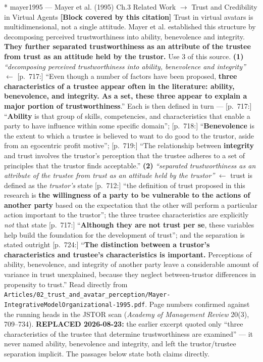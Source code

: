 \documentclass[11pt, a4paper]{article}
\makeatletter
\newcounter{citentry}
\newcommand{\citentry@core}[7]{%
  \stepcounter{citentry}
  \begingroup
  \sbox{\citentry@measurebox}{%
    \begin{minipage}{\linewidth}
      \noindent\colorbox{konstanzblue}{\parbox{\dimexpr\linewidth-2\fboxsep}{%
        \vspace{3pt}
        \textbf{\#\thecitentry \quad #2} \hfill \textit{#3}
        \vspace{3pt}
      }}
      \vspace{3pt}
      \noindent\begin{tabular}{@{}p{2.7cm} p{\dimexpr\linewidth-3cm}@{}}
        \textit{\small Sentence in thesis:} & #4 \\[5pt]
        \textbf{Usage:}\hfill       & #5 \\[5pt]
        \textit{\small Original source:}     & #6 \\[5pt]
        \textbf{How to check:}             & #7 \\
      \end{tabular}
      \vspace{5pt}
      \rule{10pt}{10pt}\quad \textbf{Validated} --- I have read the original and agree it supports the sentence.
    \end{minipage}%
  }%
  \Needspace{\dimexpr\ht\citentry@measurebox+\dp\citentry@measurebox\relax}%
  \endgroup
  \vspace{10pt}
  \noindent\colorbox{konstanzblue}{\parbox{\dimexpr\linewidth-2\fboxsep}{%
    \vspace{3pt}
    \textcolor{white}{\textbf{\#\thecitentry \quad #2}} \hfill \textcolor{white}{\textit{#3}}
    \vspace{3pt}
  }}
  \vspace{3pt}
  \noindent\begin{tabular}{@{}p{2.7cm} p{\dimexpr\linewidth-3cm}@{}}
    \textit{\small Sentence in thesis:} & \textcolor{darkgreen}{#4} \\[5pt]
    \textbf{Usage:}\hfill       & #5 \\[5pt]
    \textit{\small Original source:}     & \textcolor{darkred}{#6} \\[5pt]
    \textbf{How to check:}             & #7 \\
  \end{tabular}
  \vspace{5pt}
  \noindent\CheckBox[name=verified\thecitentry, width=10pt, height=10pt, bordercolor={0 0 0}, borderwidth=0.75, backgroundcolor={1 1 1}#1]{}\quad \textbf{Validated} --- I have read the original and agree it supports the sentence.
  \vspace{3pt}
  \noindent\textcolor{midgray}{\rule{\linewidth}{0.4pt}}
}
\newcommand{\citentry}{\@ifstar{\citentry@core{, checked}}{\citentry@core{}}}
\makeatother
\begin{document}
\begin{Form}
\citentry*
  {mayer1995 --- Mayer et al. (1995)}
  {Ch.3 Related Work $\rightarrow$ Trust and Credibility in Virtual Agents}
  {\textbf{[Block covered by this citation]} Trust in virtual avatars is multidimensional, not a single attitude. Mayer et al. established this structure by decomposing perceived trustworthiness into ability, benevolence and integrity. \textbf{They further separated trustworthiness as an attribute of the trustee from trust as an attitude held by the trustor.}}
  {Use 3 of this source.}
  {\textbf{(1)} \emph{``decomposing perceived trustworthiness into ability, benevolence and integrity''} $\leftarrow$ [p.~717:] ``Even though a number of factors have been proposed, \textbf{three characteristics of a trustee appear often in the literature: ability, benevolence, and integrity. As a set, these three appear to explain a major portion of trustworthiness}.'' Each is then defined in turn --- [p.~717:] ``\textbf{Ability} is that group of skills, competencies, and characteristics that enable a party to have influence within some specific domain''; [p.~718:] ``\textbf{Benevolence} is the extent to which a trustee is believed to want to do good to the trustor, aside from an egocentric profit motive''; [p.~719:] ``The relationship between \textbf{integrity} and trust involves the trustor's perception that the trustee adheres to a set of principles that the trustor finds acceptable.'' \quad \textbf{(2)} \emph{``separated trustworthiness as an attribute of the trustee from trust as an attitude held by the trustor''} $\leftarrow$ trust is defined as the \emph{trustor's} state [p.~712:] ``the definition of trust proposed in this research is \textbf{the willingness of a party to be vulnerable to the actions of another party} based on the expectation that the other will perform a particular action important to the trustor''; the three trustee characteristics are explicitly \emph{not} that state [p.~717:] ``\textbf{Although they are not trust per se}, these variables help build the foundation for the development of trust''; and the separation is stated outright [p.~724:] ``\textbf{The distinction between a trustor's characteristics and trustee's characteristics is important.} Perceptions of ability, benevolence, and integrity of another party leave a considerable amount of variance in trust unexplained, because they neglect between-trustor differences in propensity to trust.''}
  {Read directly from \texttt{\footnotesize Articles/02\_trust\_and\_avatar\_perception/Mayer-IntegrativeModelOrganizational-1995.pdf}. Page numbers confirmed against the running heads in the JSTOR scan (\emph{Academy of Management Review} 20(3), 709--734). \textbf{REPLACED 2026-08-23:} the earlier excerpt quoted only ``three characteristics of the trustee that determine trustworthiness are examined'' --- it never named ability, benevolence and integrity, and left the trustor/trustee separation implicit. The passages below state both claims directly.}


\end{Form}
\end{document}
